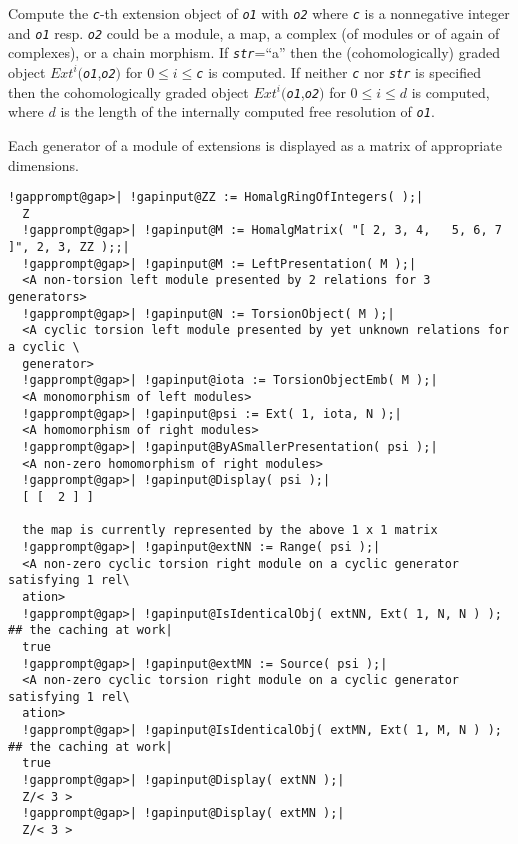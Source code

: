 \documentclass[a4paper,11pt]{report}
\begin{document}
{{{ Compute the \mbox{\texttt{\mdseries\slshape c}}-th extension object of \mbox{\texttt{\mdseries\slshape o1}} with \mbox{\texttt{\mdseries\slshape o2}} where \mbox{\texttt{\mdseries\slshape c}} is a nonnegative integer and \mbox{\texttt{\mdseries\slshape o1}} resp. \mbox{\texttt{\mdseries\slshape o2}} could be a module, a map, a complex (of modules or of again of complexes), or
a chain morphism. If \mbox{\texttt{\mdseries\slshape str}}=``a'' then the (cohomologically) graded object $Ext^i($\mbox{\texttt{\mdseries\slshape o1}},\mbox{\texttt{\mdseries\slshape o2}}$)$ for $0 \leq i \leq$\mbox{\texttt{\mdseries\slshape c}} is computed. If neither \mbox{\texttt{\mdseries\slshape c}} nor \mbox{\texttt{\mdseries\slshape str}} is specified then the cohomologically graded object $Ext^i($\mbox{\texttt{\mdseries\slshape o1}},\mbox{\texttt{\mdseries\slshape o2}}$)$ for $0 \leq i \leq d$ is computed, where $d$ is the length of the internally computed free resolution of \mbox{\texttt{\mdseries\slshape o1}}. 

 Each generator of a module of extensions is displayed as a matrix of
appropriate dimensions. 
\begin{Verbatim}[commandchars=!@|,fontsize=\small,frame=single,label=Example]
  !gapprompt@gap>| !gapinput@ZZ := HomalgRingOfIntegers( );|
  Z
  !gapprompt@gap>| !gapinput@M := HomalgMatrix( "[ 2, 3, 4,   5, 6, 7 ]", 2, 3, ZZ );;|
  !gapprompt@gap>| !gapinput@M := LeftPresentation( M );|
  <A non-torsion left module presented by 2 relations for 3 generators>
  !gapprompt@gap>| !gapinput@N := TorsionObject( M );|
  <A cyclic torsion left module presented by yet unknown relations for a cyclic \
  generator>
  !gapprompt@gap>| !gapinput@iota := TorsionObjectEmb( M );|
  <A monomorphism of left modules>
  !gapprompt@gap>| !gapinput@psi := Ext( 1, iota, N );|
  <A homomorphism of right modules>
  !gapprompt@gap>| !gapinput@ByASmallerPresentation( psi );|
  <A non-zero homomorphism of right modules>
  !gapprompt@gap>| !gapinput@Display( psi );|
  [ [  2 ] ]
  
  the map is currently represented by the above 1 x 1 matrix
  !gapprompt@gap>| !gapinput@extNN := Range( psi );|
  <A non-zero cyclic torsion right module on a cyclic generator satisfying 1 rel\
  ation>
  !gapprompt@gap>| !gapinput@IsIdenticalObj( extNN, Ext( 1, N, N ) );	## the caching at work|
  true
  !gapprompt@gap>| !gapinput@extMN := Source( psi );|
  <A non-zero cyclic torsion right module on a cyclic generator satisfying 1 rel\
  ation>
  !gapprompt@gap>| !gapinput@IsIdenticalObj( extMN, Ext( 1, M, N ) );	## the caching at work|
  true
  !gapprompt@gap>| !gapinput@Display( extNN );|
  Z/< 3 >
  !gapprompt@gap>| !gapinput@Display( extMN );|
  Z/< 3 >
\end{Verbatim}
 }

}}
\end{document}
